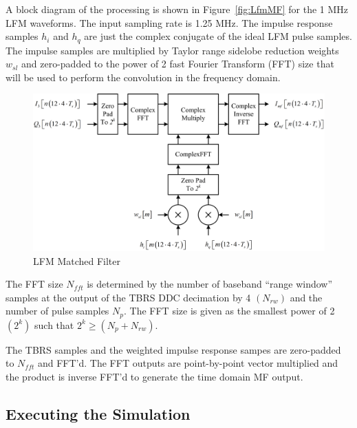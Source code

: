 \documentclass[12pt,english]{article}
\newcommand{\lp}{\left(}
\newcommand{\rp}{\right)}
\begin{document}
A block diagram of the processing is shown in Figure~\vref{fig:LfmMF}
for the 1 MHz LFM waveforms. The input sampling rate is 1.25 MHz. The
impulse response samples $h_i$ and $h_q$ are just the complex
conjugate of the ideal LFM pulse samples. The impulse samples are
multiplied by Taylor range sidelobe reduction weights $w_{sl}$ and
zero-padded to the power of 2 fast Fourier Transform (FFT) size that
will be used to perform the convolution in the frequency domain.
\begin{figure}[ht]
  \noindent \begin{centering}
  \includegraphics[width=5.0in]{LfmMF.png}\medskip{}
  \caption{LFM Matched Filter}
  \label{fig:LfmMF}
  \par \end{centering}
\end{figure}

The FFT size $N_{fft}$ is determined by the number of baseband ``range window''
samples at the output of the TBRS DDC decimation by 4 $\lp N_{rw}
\rp$ and the number of pulse samples $N_p$. The FFT size is given as
the smallest power of 2 $\lp 2^k \rp$ such that $2^k \ge \lp N_p + N_{rw}\rp$.

The TBRS samples and the weighted impulse response sampes are
zero-padded to $N_{fft}$ and FFT'd. The FFT outputs are point-by-point
vector multiplied and the product is inverse FFT'd to generate the
time domain MF output.

\subsection{Executing the Simulation}
\end{document}
